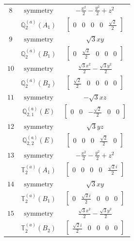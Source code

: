 \documentclass[fleqn,8pt,landscape]{jsarticle}
\begin{document}
\begin{longtable}{ccc}
$ 8 $ & $ \text{symmetry} $ & $ - \frac{x^{2}}{2} - \frac{y^{2}}{2} + z^{2} $ \\
$  $ & $ \mathbb{Q}_{2}^{(a)}(A_{1}) $ & $ \begin{bmatrix} 0 & 0 & 0 & 0 & \frac{\sqrt{2}}{2} \end{bmatrix} $ \\ \hline
$ 9 $ & $ \text{symmetry} $ & $ \sqrt{3} x y $ \\
$  $ & $ \mathbb{Q}_{2}^{(a)}(B_{1}) $ & $ \begin{bmatrix} 0 & \frac{\sqrt{2}}{2} & 0 & 0 & 0 \end{bmatrix} $ \\ \hline
$ 10 $ & $ \text{symmetry} $ & $ \frac{\sqrt{3} x^{2}}{2} - \frac{\sqrt{3} y^{2}}{2} $ \\
$  $ & $ \mathbb{Q}_{2}^{(a)}(B_{2}) $ & $ \begin{bmatrix} \frac{\sqrt{2}}{2} & 0 & 0 & 0 & 0 \end{bmatrix} $ \\ \hline
$ 11 $ & $ \text{symmetry} $ & $ - \sqrt{3} x z $ \\
$  $ & $ \mathbb{Q}_{2,1}^{(a)}(E) $ & $ \begin{bmatrix} 0 & 0 & - \frac{\sqrt{2}}{2} & 0 & 0 \end{bmatrix} $ \\ \hline
$ 12 $ & $ \text{symmetry} $ & $ \sqrt{3} y z $ \\
$  $ & $ \mathbb{Q}_{2,2}^{(a)}(E) $ & $ \begin{bmatrix} 0 & 0 & 0 & \frac{\sqrt{2}}{2} & 0 \end{bmatrix} $ \\ \hline
$ 13 $ & $ \text{symmetry} $ & $ - \frac{x^{2}}{2} - \frac{y^{2}}{2} + z^{2} $ \\
$  $ & $ \mathbb{T}_{2}^{(a)}(A_{1}) $ & $ \begin{bmatrix} 0 & 0 & 0 & 0 & \frac{\sqrt{2} i}{2} \end{bmatrix} $ \\ \hline
$ 14 $ & $ \text{symmetry} $ & $ \sqrt{3} x y $ \\
$  $ & $ \mathbb{T}_{2}^{(a)}(B_{1}) $ & $ \begin{bmatrix} 0 & \frac{\sqrt{2} i}{2} & 0 & 0 & 0 \end{bmatrix} $ \\ \hline
$ 15 $ & $ \text{symmetry} $ & $ \frac{\sqrt{3} x^{2}}{2} - \frac{\sqrt{3} y^{2}}{2} $ \\
$  $ & $ \mathbb{T}_{2}^{(a)}(B_{2}) $ & $ \begin{bmatrix} \frac{\sqrt{2} i}{2} & 0 & 0 & 0 & 0 \end{bmatrix} $ \\ \hline

\end{longtable}
\end{document}
